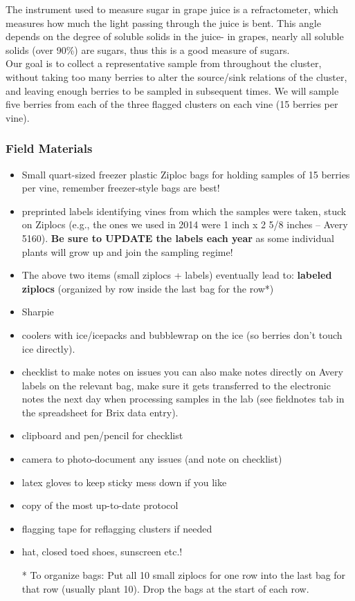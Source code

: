 \documentclass[11pt,letter]{article}
\newenvironment{smitemize}{
\begin{itemize}
  \setlength{\itemsep}{0pt}
  \setlength{\parskip}{0.8pt}
  \setlength{\parsep}{0pt}}
{\end{itemize}
}
\begin{document}
The instrument used to measure sugar in grape juice is a refractometer, which measures how much the light passing through the juice is bent. This angle depends on the degree of soluble solids in the juice- in grapes, nearly all soluble solids (over 90\%) are sugars, thus this is a good measure of sugars. \\

Our goal is to collect a representative sample from throughout the cluster, without taking too many berries to alter the source/sink relations of the cluster, and leaving enough berries to be sampled in subsequent times. We will sample five berries from each of the three flagged clusters on each vine (15 berries per vine). 

\subsubsection{Field Materials}
\begin{smitemize}
\item Small quart-sized freezer plastic Ziploc bags for holding samples of 15 berries per vine, remember freezer-style bags are best!
\item preprinted labels identifying vines from which the samples were taken, stuck on Ziplocs (e.g., the ones we used in 2014 were 1 inch x 2 5/8 inches -- Avery 5160). {\bf Be sure to UPDATE the labels each year} as some individual plants will grow up and join the sampling regime!
\item The above two items (small ziplocs + labels) eventually lead to: {\bf labeled ziplocs} (organized by row inside the last bag for the row*)
\item Sharpie
\item coolers with ice/icepacks and bubblewrap on the ice (so berries don’t touch ice directly). 
\item checklist to make notes on issues you can also make notes directly on Avery labels on the relevant bag, make sure it gets transferred to the electronic notes the next day  when processing samples in the lab (see fieldnotes tab in the spreadsheet for Brix data entry). 
\item clipboard and pen/pencil for checklist
\item camera to photo-document any issues (and note on checklist)
\item latex gloves to keep sticky mess down if you like
\item copy of the most up-to-date protocol
\item flagging tape for reflagging clusters if needed
\item hat, closed toed shoes, sunscreen etc.!

* To organize bags: Put all 10 small ziplocs for one row into the last bag for that row (usually plant 10). Drop the bags at the start of each row.

\end{smitemize}
\end{document}
